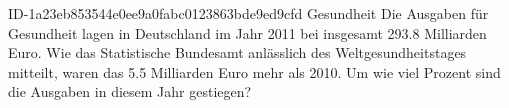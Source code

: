 \begin{exercise}
      {ID-1a23eb853544e0ee9a0fabc0123863bde9ed9cfd}
      {Gesundheit}
  \ifproblem\problem
    Die Ausgaben für Gesundheit lagen in Deutschland im Jahr 2011 bei insgesamt
    \num{293.8} Milliarden Euro. Wie das Statistische Bundesamt anlässlich des
    Weltgesundheitstages mitteilt, waren das \num{5.5} Milliarden Euro mehr als 2010.
    Um wie viel Prozent sind die Ausgaben in diesem Jahr gestiegen?
  \fi
\end{exercise}
